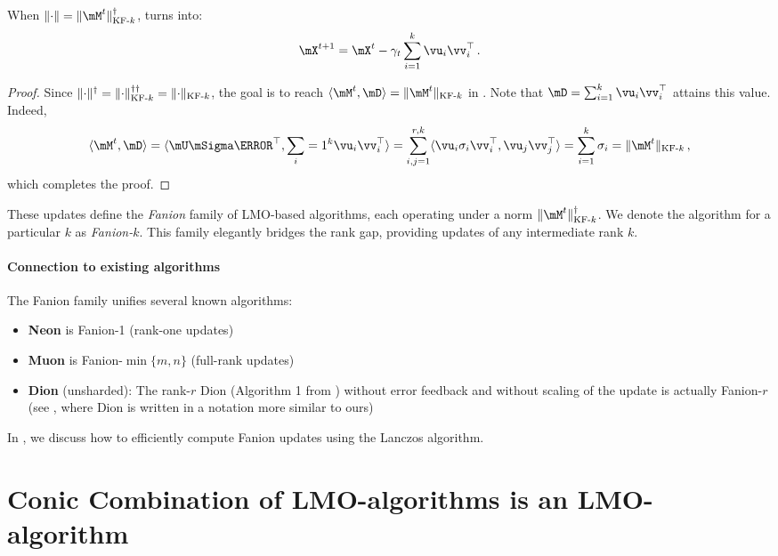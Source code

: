 \documentclass[pmlr]{jmlr}%
\newcommand{\norm}[1]{\lVert #1\rVert}
\DeclarePairedDelimiter{\normkfk}{\|}{\|_{\text{KF-}k}}
\def\<#1,#2>{\langle #1,#2\rangle}
\begin{document}
 \begin{lemma}\label{lemma:ky_fan_update}
   When $\norm{\cdot} = \normkfk{\mM^t}^\dagger$,  turns into:
   \begin{equation}\label{eq:ky_fan_update}
     \mX^{t+1} = \mX^{t} - \gamma_t \sum_{i=1}^{k}\vu_i \vv_i^\top\,.
   \end{equation}
 \end{lemma}
 
 \begin{proof}
 Since $\norm{\cdot}^\dagger = \normkfk{\cdot}^{\dagger\dagger} = \normkfk{\cdot}$, the goal is to reach $\<\mM^t, \mD> = \normkfk{\mM^t}$ in . Note that $\mD = \sum_{i=1}^{k} \vu_i \vv_i^\top$ attains this value. Indeed,
 \[
 \<\mM^t, \mD> =\<\mU \mSigma \mV^\top, \sum_{i=1}^{k} \vu_i \vv_i^\top> = \sum_{i,j=1}^{r, k}\<\vu_i \sigma_i \vv_i^\top, \vu_j \vv_j^\top> = \sum_{i=1}^{k}\sigma_i = \normkfk{\mM^t}\,,
 \]
 which completes the proof.
 \end{proof}
 
 These updates define the \emph{Fanion} family of LMO-based algorithms, each operating under a norm $\normkfk{\mM^t}^\dagger$. We denote the algorithm for a particular $k$ as \emph{Fanion-$k$}. This family elegantly bridges the rank gap, providing updates of any intermediate rank $k$.
 
 \paragraph{Connection to existing algorithms}
 The Fanion family unifies several known algorithms:
 \begin{itemize}
   \item \textbf{Neon} is Fanion-1 (rank-one updates)
   \item \textbf{Muon} is Fanion-$\min\{m,n\}$ (full-rank updates)
   \item \textbf{Dion} (unsharded): The rank-$r$ Dion (Algorithm 1 from \citep{ahn2025dion}) without error feedback and without scaling of the update is actually Fanion-$r$ (see \citep{pethick2025understandingdion}, where Dion is written in a notation more similar to ours)
 \end{itemize}
 
 In , we discuss how to efficiently compute Fanion updates using the Lanczos algorithm.
 
 \section{Conic Combination of LMO-algorithms is an LMO-algorithm}
 \label{sec:conic_combo}
 
\end{document}
